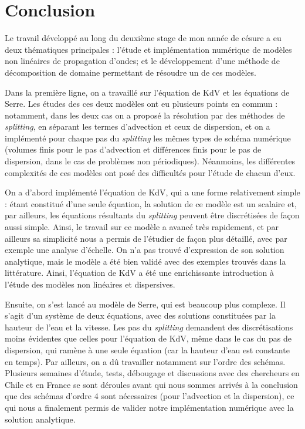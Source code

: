 \section{Conclusion}

\indent Le travail développé au long du deuxième stage de mon année de césure a eu deux thématiques principales : l'étude et implémentation numérique de modèles non linéaires de propagation d'ondes; et le développement d'une méthode de décomposition de domaine permettant de résoudre un de ces modèles.

\indent Dans la première ligne, on a travaillé sur l'équation de KdV et les équations de Serre. Les études des ces deux modèles ont eu plusieurs points en commun : notamment, dans les deux cas on a proposé la résolution par des méthodes de \emph{splitting}, en séparant les termes d'advection et ceux de dispersion, et on a implémenté pour chaque pas du \emph{splitting} les mêmes types de schéma numérique (volumes finis pour le pas d'advection et différences finis pour le pas de dispersion, dans le cas de problèmes non périodiques). Néanmoins, les différentes complexités de ces modèles ont posé des difficultés pour l'étude de chacun d'eux.

\indent On a d'abord implémenté l'équation de KdV, qui a une forme relativement simple : étant constitué d'une seule équation, la solution de ce modèle est un scalaire et, par ailleurs, les équations résultants du \emph{splitting} peuvent être discrétisées de façon aussi simple. Ainsi, le travail sur ce modèle a avancé très rapidement, et par ailleurs sa simplicité nous a permis de l'étudier de façon plus détaillé, avec par exemple une analyse d'échelle. On n'a pas trouvé d'expression de son solution analytique, mais le modèle a été bien validé avec des exemples trouvés dans la littérature. Ainsi, l'équation de KdV a été une enrichissante introduction à l'étude des modèles non linéaires et dispersives. 

\indent Ensuite, on s'est lancé au modèle de Serre, qui est beaucoup plus complexe. Il s'agit d'un système de deux équations, avec des solutions constituées par la hauteur de l'eau et la vitesse. Les pas du \emph{splitting} demandent des discrétisations moins évidentes que celles pour l'équation de KdV, même dans le cas du pas de dispersion, qui ramène à une seule équation (car la hauteur d'eau est constante en temps). Par ailleurs, on a dû travailler notamment sur l'ordre des schémas. Plusieurs semaines d'étude, tests, débougage et discussions avec des chercheurs en Chile et en France se sont déroules avant qui nous sommes arrivés à la conclusion que des schémas d'ordre 4 sont nécessaires (pour l'advection et la dispersion), ce qui nous a finalement permis de valider notre implémentation numérique avec la solution analytique.

